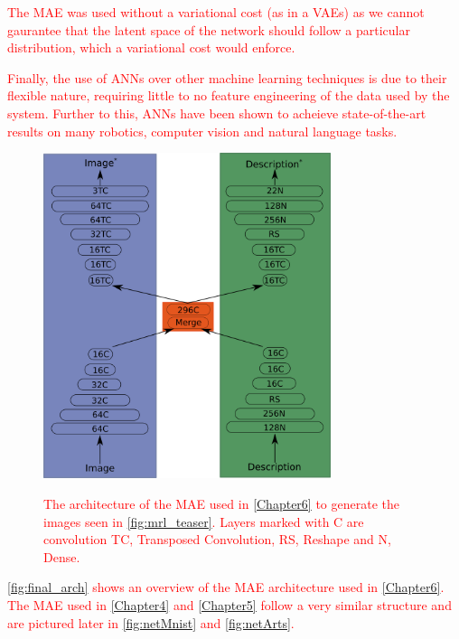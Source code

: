\textcolor{red}{The \ac{MAE} was used without a variational cost (as in a \acp{VAE}) as we cannot gaurantee that the latent space of the network should follow a particular distribution, which a variational cost would enforce.}

\textcolor{red}{Finally, the use of \acp{ANN} over other machine learning techniques is due to their flexible nature, requiring little to no feature engineering of the data used by the system. Further to this, \acp{ANN} have been shown to acheieve state-of-the-art results on many robotics, computer vision and natural language tasks.}

\begin{figure}
\centering
\includegraphics[width=0.75\textwidth]{Figs/shapes/maeArch.png}
\label{fig:final_arch}
\caption{\textcolor{red}{The architecture of the MAE used in \autoref{Chapter6} to generate the images seen in \autoref{fig:mrl_teaser}. Layers marked with C are convolution TC, Transposed Convolution, RS, Reshape and N, Dense.}}
\end{figure}

\textcolor{red}{\autoref{fig:final_arch} shows an overview of the \ac{MAE} architecture used in \autoref{Chapter6}. The \ac{MAE} used in \autoref{Chapter4} and \autoref{Chapter5} follow a very similar structure and are pictured later in \autoref{fig:netMnist} and \autoref{fig:netArts}.} 











